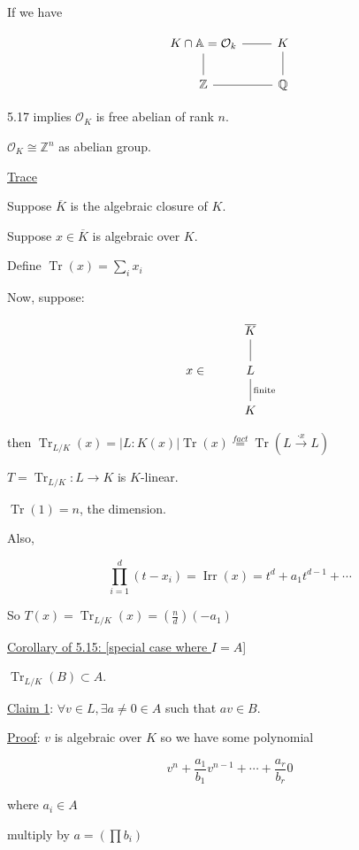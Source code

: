 \documentclass{article}
\theoremstyle{definition}
\begin{document}
If we have

\[
    \begin{tikzcd}
        K\cap\mathbb{A} = \mathcal{O}_k \ar[r, no head] & K \\
        \mathbb{Z} \ar[u, no head] \ar[r, no head] & \mathbb{Q} \ar[u, no head]
    \end{tikzcd}
\]

5.17 implies \(\mathcal{O}_K\) is free abelian of rank \(n\).

\(\mathcal{O}_K \cong \mathbb{Z}^n\) as abelian group. 

\underline{Trace} 

Suppose \(\overline{K}\) is the algebraic closure of \(K\).

Suppose \(x\in \overline{K}\) is algebraic over \(K\).

\newcommand{\Tr}{\operatorname{Tr}}

Define \(\Tr(x)=\sum_{i} x_i\) 

Now, suppose:

\[
    \begin{tikzcd}
        & \overline{K} \ar[d, no head]\\
        x\in & L\ar[d, no head,"\text{finite}"] \\
        & K
    \end{tikzcd}
\]

then \(\Tr_{L / K}(x) = \vert L:K(x) \vert \Tr (x) \overset{fact}{=} \Tr(L \overset{\cdot x}{\to} L)\) 

\(T=\Tr_{L / K}: L \to K\) is \(K\)-linear. 

\(\Tr(1)=n\), the dimension.

Also,

\[
    \prod_{i=1}^d (t - x_i) = \operatorname{Ir r}(x) = t^d + a_1 t^{d-1} + \cdots 
\]

So \(T(x) = \Tr_{L / K}(x) = (\frac{n}{d})(-a_1)\) 

\underline{Corollary of 5.15: [special case where \(I = A\)]} 

\(\Tr_{L / K}(B) \subset A\).

\underline{Claim 1}: \(\forall v\in L, \exists a \neq 0 \in A\) such that \(av\in B\).

\underline{Proof}: \(v\) is algebraic over \(K\) so we have some polynomial

\[
    v^n + \frac{a_1}{b_1} v^{n-1} + \cdots + \frac{a_r}{b_r}  0
\]

where \(a_i\in A\)

multiply by \(a = (\prod b_i)\)
\end{document}
